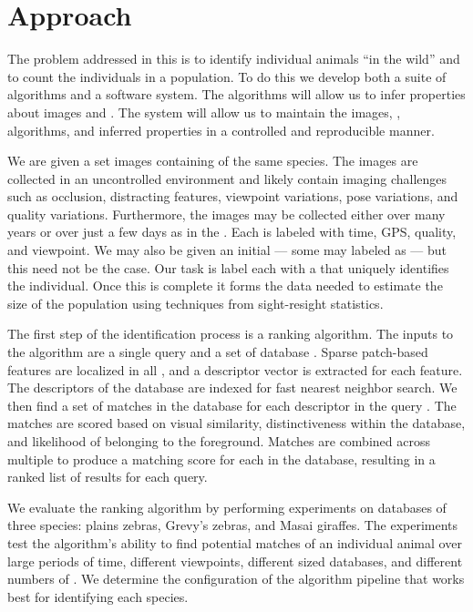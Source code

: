 \section{Approach}
    The problem addressed in this \thesis{} is to identify individual animals
    ``in the wild'' and to count the individuals in a population. To do this we
    develop both a suite of algorithms and a software system. The algorithms
    will allow us to infer properties about images and \annots{}. The system
    will allow us to maintain the images, \annots{}, algorithms, and inferred
    properties in a controlled and reproducible manner.

    We are given a set images containing \annots{} of the same species. The
    images are collected in an uncontrolled environment and likely contain
    imaging challenges such as occlusion, distracting features, viewpoint
    variations, pose variations, and quality variations. Furthermore, the images
    may be collected either over many years or over just a few days as in the
    \GZC{}. Each \annot{} is labeled with time, GPS, quality, and viewpoint. We
    may also be given an initial \masterdatabase{} --- \ie{} some \annots{} may
    labeled as \exemplars{} --- but this need not be the case. Our task is label
    each \annot{} with a \glossterm{\name{}} that uniquely identifies the
    individual. Once this is complete it forms the data needed to estimate the
    size of the population using techniques from sight-resight statistics.

    The first step of the identification process is a ranking algorithm. The
    inputs to the algorithm are a single query \annot{} and a set of database
    \annots{}. Sparse patch-based features are localized in all \annots{}, and a
    descriptor vector is extracted for each feature. The descriptors of the
    database \annots{} are indexed for fast nearest neighbor search. We then
    find a set of matches in the database for each descriptor in the query
    \annot{}. The matches are scored based on visual similarity, distinctiveness
    within the database, and likelihood of belonging to the foreground. Matches
    are combined across multiple \exemplar{} \annots{} to produce a matching
    score for each \name{} in the database, resulting in a ranked list of
    results for each query.

    We evaluate the ranking algorithm by performing experiments on databases of
    three species: plains zebras, Grevy's zebras, and Masai giraffes. The
    experiments test the algorithm's ability to find potential matches of an
    individual animal over large periods of time, different viewpoints,
    different sized databases, and different numbers of \exemplars{}. We
    determine the configuration of the algorithm pipeline that works best for
    identifying each species.

